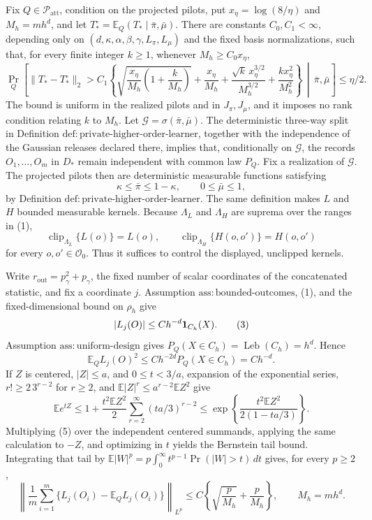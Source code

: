 Fix \(Q\in\mathcal P_{\mathrm{att}}\), condition on the projected pilots, put \(x_\eta=\log(8/\eta)\) and \(M_h=mh^d\), and let \(T_*^\circ=\mathbb E_Q(T_*\mid\bar\pi,\bar\mu)\).  There are constants \(C_0,C_1<\infty\), depending only on \((d,\kappa,\alpha,\beta,\gamma,L_\pi,L_\mu)\) and the fixed basis normalizations, such that, for every finite integer \(k\ge1\), whenever \(M_h\ge C_0x_\eta\),
\[
 \Pr_Q\!\left[
 \lVert T_*-T_*^\circ\rVert_2>C_1\left\{
 \sqrt{\frac{x_\eta}{M_h}\left(1+\frac{k}{M_h}\right)}
 +\frac{x_\eta}{M_h}
 +\frac{\sqrt{k}\,x_\eta^{3/2}}{M_h^{3/2}}
 +\frac{kx_\eta^2}{M_h^2}
 \right\}\,\middle|\,\bar\pi,\bar\mu\right]
 \le\eta/2.
\]
The bound is uniform in the realized pilots and in \(J_\pi,J_\mu\), and it imposes no rank condition relating \(k\) to \(M_h\).
Let \(\mathcal G=\sigma(\bar\pi,\bar\mu)\).  The deterministic three-way split in Definition \(\mathrm{def{:}private\text{-}higher\text{-}order\text{-}learner}\), together with the independence of the Gaussian releases declared there, implies that, conditionally on \(\mathcal G\), the records \(O_1,\ldots,O_m\) in \(D_*\) remain independent with common law \(P_Q\).  Fix a realization of \(\mathcal G\).  The projected pilots then are deterministic measurable functions satisfying
\[
 \kappa\leq \bar\pi\leq1-\kappa,
 \qquad 0\leq\bar\mu\leq1,
\tag{1}
\]
by Definition \(\mathrm{def{:}private\text{-}higher\text{-}order\text{-}learner}\).  The same definition makes \(L\) and \(H\) bounded measurable kernels.  Because \(\Lambda_L\) and \(\Lambda_H\) are suprema over the ranges in (1),
\[
 \operatorname{clip}_{\Lambda_L}\{L(o)\}=L(o),
 \qquad
 \operatorname{clip}_{\Lambda_H}\{H(o,o')\}=H(o,o')
\tag{2}
\]
for every \(o,o'\in\mathcal O_0\).  Thus it suffices to control the displayed, unclipped kernels.

Write \(r_{\mathrm{out}}=p_\gamma^2+p_\gamma\), the fixed number of scalar coordinates of the concatenated statistic, and fix a coordinate \(j\).  Assumption \(\mathrm{ass{:}bounded\text{-}outcomes}\), (1), and the fixed-dimensional bound on \(\rho_h\) give
\[
 |L_j(O)|\leq C h^{-d}{\bf1}_{C_h}(X).
\tag{3}
\]
Assumption \(\mathrm{ass{:}uniform\text{-}design}\) gives \(P_Q(X\in C_h)=\operatorname{Leb}(C_h)=h^d\).  Hence
\[
 \mathbb E_Q L_j(O)^2\leq C h^{-2d}P_Q(X\in C_h)=C h^{-d}.
\tag{4}
\]
If \(Z\) is centered, \(|Z|\leq a\), and \(0\leq t<3/a\), expansion of the exponential series, \(r!\geq2\,3^{r-2}\) for \(r\geq2\), and \(\mathbb E|Z|^r\leq a^{r-2}\mathbb EZ^2\) give
\[
 \mathbb E e^{tZ}
 \leq1+\frac{t^2\mathbb EZ^2}{2}
       \sum_{r=2}^{\infty}(ta/3)^{r-2}
 \leq\exp\!\left\{\frac{t^2\mathbb EZ^2}{2(1-ta/3)}\right\}.
\tag{5}
\]
Multiplying (5) over the independent centered summands, applying the same calculation to \(-Z\), and optimizing in \(t\) yields the Bernstein tail bound.  Integrating that tail by
\(\mathbb E|W|^p=p\int_0^\infty t^{p-1}\Pr(|W|>t)\,dt\) gives, for every \(p\geq2\),
\[
 \left\|\frac1m\sum_{i=1}^m
       \{L_j(O_i)-\mathbb E_Q L_j(O_i)\}\right\|_{L^p}
 \leq C\left\{\sqrt{\frac p{M_h}}+\frac p{M_h}\right\},
 \qquad M_h=mh^d.
\tag{6}
\]

